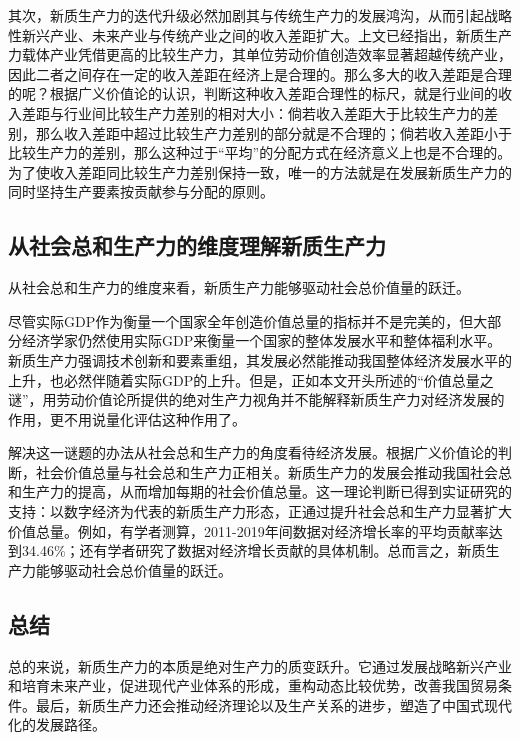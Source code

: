 其次，新质生产力的迭代升级必然加剧其与传统生产力的发展鸿沟\cite[39-40]{ChenZhangHongGuanJingJiBoDongShiZhengFenXiDeYiZhongSiLuShiLunShengChanLiFeiPingHengJieGouYuJingJiBoDong1999}，从而引起战略性新兴产业、未来产业与传统产业之间的收入差距扩大\cite[31]{CaiJiMingXinZhiShengChanLiDeFaZhanDuiJieZhiChuangZaoHeJingJiZengChangDeGongXian2024}。上文已经指出，新质生产力载体产业凭借更高的比较生产力​，其单位劳动价值创造效率显著超越传统产业，因此二者之间存在一定的收入差距在经济上是合理的。那么多大的收入差距是合理的呢？根据广义价值论的认识，判断这种收入差距合理性的标尺，就是行业间的收入差距与行业间比较生产力差别的相对大小：倘若收入差距大于比较生产力的差别，那么收入差距中超过比较生产力差别的部分就是不合理的；倘若收入差距小于比较生产力的差别，那么这种过于“平均”的分配方式在经济意义上也是不合理\cite[69]{CaiJiMingLongDuanHeJingZhengXingYeDeBiJiaoShengChanLiYuShouRuChaiJuJiYuGuangYiJieZhiLunDeFenXi2014}的。为了使收入差距同比较生产力差别保持一致，唯一的方法就是在发展新质生产力的同时坚持生产要素按贡献参与分配的原则\cite[58]{CaiJiMingMaKeSiLaoDongShengChanLiYuJieZhiLiangZhengXiangGuanYuanLiDeKuoZhanJiYingYongJianLunXinZhiShengChanLiDeFaZhanYuWoGuoJiBenJingJiZhiDuDeWanShan2025}。

\subsection{从社会总和生产力的维度理解新质生产力}

从社会总和生产力的维度来看，新质生产力能够驱动社会总价值量的跃迁。

尽管实际GDP作为衡量一个国家全年创造价值总量的指标并不是完美的，但大部分经济学家仍然使用实际GDP来衡量一个国家的整体发展水平和整体福利水平\cite[386]{BaoLuo*SaMouErSenJingJiXueDiShiJiuBan2012}\cite[17-24]{n.GeLiGaoLi*ManKunJingJiXueYuanLiDi7BanHongGuanJingJiFenCe2015}。新质生产力强调技术创新和要素重组，其发展必然能推动我国整体经济发展水平的上升，也必然伴随着实际GDP的上升。但是，正如本文开头所述的“价值总量之谜”，用劳动价值论所提供的绝对生产力视角并不能解释新质生产力对经济发展的作用，更不用说量化评估这种作用了。

解决这一谜题的办法从社会总和生产力的角度看待经济发展。根据广义价值论的判断，社会价值总量与社会总和生产力正相关。新质生产力的发展会推动我国社会总和生产力的提高，从而增加每期的社会价值总量。这一理论判断已得到实证研究的支持：以数字经济为代表的新质生产力形态，正通过提升社会总和生产力显著扩大价值总量。例如，有学者测算，2011-2019年间数据对经济增长率的平均贡献率达到34.46\%\cite[63]{LiuTaoXiongShuJuZiBenGuSuanJiDuiZhongGuoJingJiZengChangDeGongXianJiYuShuJuJieZhiLianDeShiJiao2023}；还有学者研究了数据对经济增长贡献的具体机制\cite{CaiJiMingLunShuJuYaoSuAnGongXianCanYuFenPeiDeJieZhiJiChuJiYuGuangYiJieZhiLunDeShiJiao2023}\cite{RenBaoPingShuZiXinZhiShengChanLiTuiDongJingJiGaoZhiLiangFaZhanDeLuoJiYuLuJing2023}。总而言之，新质生产力能够驱动社会总价值量的跃迁。

\subsection{总结}

总的来说，新质生产力的本质是绝对生产力的质变跃升。它通过发展战略新兴产业和培育未来产业，促进现代产业体系的形成，重构动态比较优势，改善我国贸易条件。最后，新质生产力还会推动经济理论以及生产关系的进步，塑造了中国式现代化的发展路径。